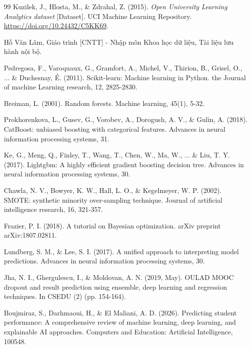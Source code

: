 \documentclass[a4paper]{report}
\begin{document}
\begin{thebibliography}{99}
  Kuzilek, J., Hlosta, M., \& Zdrahal, Z. (2015). \textit{Open University
  Learning Analytics dataset} [Dataset]. UCI Machine Learning Repository.
  \url{https://doi.org/10.24432/C5KK69}.
  
  Hồ Văn Lâm, Giáo trình [CNTT] - Nhập môn Khoa học dữ liệu, Tài liệu lưu hành nội bộ.

  Pedregosa, F., Varoquaux, G., Gramfort, A., Michel, V., Thirion, B., Grisel,
  O., ... \& Duchesnay, É. (2011). Scikit-learn: Machine learning in Python. 
  the Journal of machine Learning research, 12, 2825-2830.

  Breiman, L. (2001). Random forests. Machine learning, 45(1), 5-32.

  Prokhorenkova, L., Gusev, G., Vorobev, A., Dorogush, A. V., \& Gulin, A. (2018). 
  CatBoost: unbiased boosting with categorical features. 
  Advances in neural information processing systems, 31.

  Ke, G., Meng, Q., Finley, T., Wang, T., Chen, W., Ma, W., ... \& Liu, T. Y. (2017).
  Lightgbm: A highly efficient gradient boosting decision tree. 
  Advances in neural information processing systems, 30.

  Chawla, N. V., Bowyer, K. W., Hall, L. O., \& Kegelmeyer, W. P. (2002). 
  SMOTE: synthetic minority over-sampling technique. 
  Journal of artificial intelligence research, 16, 321-357.

  Frazier, P. I. (2018). A tutorial on Bayesian optimization. arXiv preprint arXiv:1807.02811.

  Lundberg, S. M., \& Lee, S. I. (2017). A unified approach to interpreting model predictions.
  Advances in neural information processing systems, 30.

  Jha, N. I., Ghergulescu, I., \& Moldovan, A. N. (2019, May).
  OULAD MOOC dropout and result prediction using ensemble, 
  deep learning and regression techniques. 
  In CSEDU (2) (pp. 154-164).

  Boujmiraz, S., Darhmaoui, H., \& El Maliani, A. D. (2026). 
  Predicting student performance: A comprehensive review of machine learning, 
  deep learning, and explainable AI approaches.
  Computers and Education: Artificial Intelligence, 100548.


\end{thebibliography}
\end{document}
